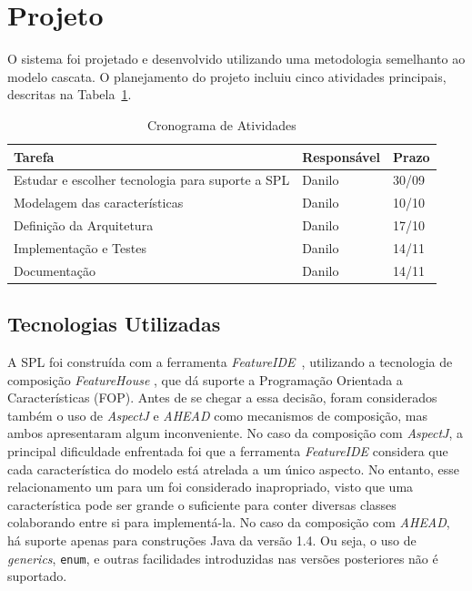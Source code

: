 \documentclass[12pt]{article}
\newcommand{\tra}[1]{\renewcommand{\arraystretch}{#1}}
\begin{document}
\FloatBarrier
\section{Projeto}
\label{sec:design}

O sistema foi projetado e desenvolvido utilizando uma metodologia semelhanto ao modelo cascata. O planejamento do projeto incluiu cinco atividades principais, descritas na Tabela~\ref{tab:activities}.

\begin{table}[htb]\centering
\tra{1.1}
\begin{tabular}{@{}lll@{}}\toprule
\textbf{Tarefa} & \textbf{Responsável} & \textbf{Prazo} \\
\midrule
Estudar e escolher tecnologia para suporte a SPL & Danilo & 30/09 \\
Modelagem das características & Danilo & 10/10 \\
Definição da Arquitetura & Danilo & 17/10 \\
Implementação e Testes & Danilo & 14/11 \\
Documentação & Danilo & 14/11 \\
\bottomrule
\end{tabular}
\caption{Cronograma de Atividades}
\label{tab:activities}
\end{table}


\subsection{Tecnologias Utilizadas}

A SPL foi construída com a ferramenta \emph{FeatureIDE}~\cite{kastner2009featureide}, utilizando a tecnologia de composição \emph{FeatureHouse} \cite{apel2009featurehouse}, que dá suporte a Programação Orientada a Características (FOP). %
Antes de se chegar a essa decisão, foram considerados também o uso de \emph{AspectJ} e \emph{AHEAD} como mecanismos de composição, mas ambos apresentaram algum inconveniente. No caso da composição com \emph{AspectJ}, a principal dificuldade enfrentada foi que a ferramenta \emph{FeatureIDE} considera que cada característica do modelo está atrelada a um único aspecto. No entanto, esse relacionamento um para um foi considerado inapropriado, visto que uma característica pode ser grande o suficiente para conter diversas classes colaborando entre si para implementá-la.
No caso da composição com \emph{AHEAD}, há suporte apenas para construções Java da versão 1.4. Ou seja, o uso de \emph{generics}, \texttt{enum}, e outras facilidades introduzidas nas versões posteriores não é suportado.
\end{document}
